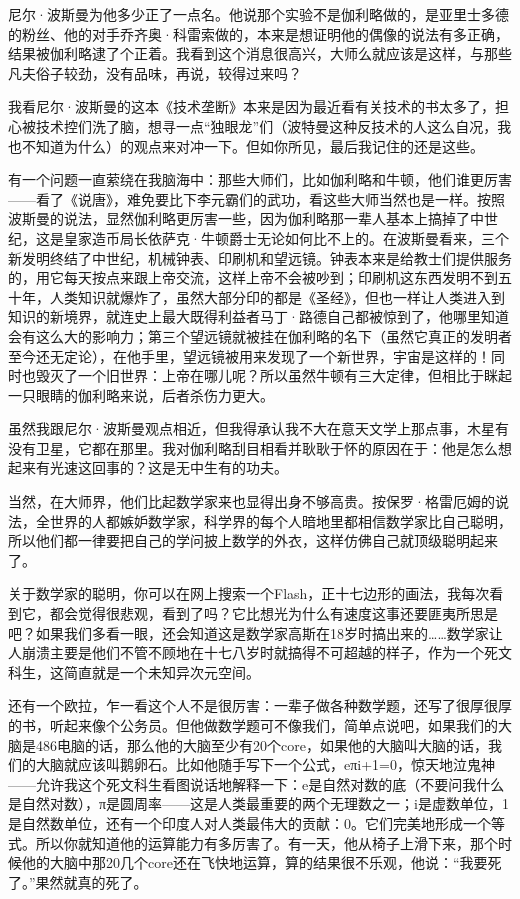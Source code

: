 尼尔·波斯曼为他多少正了一点名。他说那个实验不是伽利略做的，是亚里士多德的粉丝、他的对手乔齐奥·科雷索做的，本来是想证明他的偶像的说法有多正确，结果被伽利略逮了个正着。我看到这个消息很高兴，大师么就应该是这样，与那些凡夫俗子较劲，没有品味，再说，较得过来吗？

我看尼尔·波斯曼的这本《技术垄断》本来是因为最近看有关技术的书太多了，担心被技术控们洗了脑，想寻一点``独眼龙''们（波特曼这种反技术的人这么自况，我也不知道为什么）的观点来对冲一下。但如你所见，最后我记住的还是这些。

有一个问题一直萦绕在我脑海中：那些大师们，比如伽利略和牛顿，他们谁更厉害------看了《说唐》，难免要比下李元霸们的武功，看这些大师当然也是一样。按照波斯曼的说法，显然伽利略更厉害一些，因为伽利略那一辈人基本上搞掉了中世纪，这是皇家造币局长依萨克·牛顿爵士无论如何比不上的。在波斯曼看来，三个新发明终结了中世纪，机械钟表、印刷机和望远镜。钟表本来是给教士们提供服务的，用它每天按点来跟上帝交流，这样上帝不会被吵到；印刷机这东西发明不到五十年，人类知识就爆炸了，虽然大部分印的都是《圣经》，但也一样让人类进入到知识的新境界，就连史上最大既得利益者马丁·路德自己都被惊到了，他哪里知道会有这么大的影响力；第三个望远镜就被挂在伽利略的名下（虽然它真正的发明者至今还无定论），在他手里，望远镜被用来发现了一个新世界，宇宙是这样的！同时也毁灭了一个旧世界：上帝在哪儿呢？所以虽然牛顿有三大定律，但相比于眯起一只眼睛的伽利略来说，后者杀伤力更大。

虽然我跟尼尔·波斯曼观点相近，但我得承认我不大在意天文学上那点事，木星有没有卫星，它都在那里。我对伽利略刮目相看并耿耿于怀的原因在于：他是怎么想起来有光速这回事的？这是无中生有的功夫。

当然，在大师界，他们比起数学家来也显得出身不够高贵。按保罗·格雷厄姆的说法，全世界的人都嫉妒数学家，科学界的每个人暗地里都相信数学家比自己聪明，所以他们都一律要把自己的学问披上数学的外衣，这样仿佛自己就顶级聪明起来了。

关于数学家的聪明，你可以在网上搜索一个Flash，正十七边形的画法，我每次看到它，都会觉得很悲观，看到了吗？它比想光为什么有速度这事还要匪夷所思是吧？如果我们多看一眼，还会知道这是数学家高斯在18岁时搞出来的\ldots{}\ldots{}数学家让人崩溃主要是他们不管不顾地在十七八岁时就搞得不可超越的样子，作为一个死文科生，这简直就是一个未知异次元空间。

还有一个欧拉，乍一看这个人不是很厉害：一辈子做各种数学题，还写了很厚很厚的书，听起来像个公务员。但他做数学题可不像我们，简单点说吧，如果我们的大脑是486电脑的话，那么他的大脑至少有20个core，如果他的大脑叫大脑的话，我们的大脑就应该叫鹅卵石。比如他随手写下一个公式，eπi+1=0，惊天地泣鬼神------允许我这个死文科生看图说话地解释一下：e是自然对数的底（不要问我什么是自然对数），π是圆周率------这是人类最重要的两个无理数之一；i是虚数单位，1是自然数单位，还有一个印度人对人类最伟大的贡献：0。它们完美地形成一个等式。所以你就知道他的运算能力有多厉害了。有一天，他从椅子上滑下来，那个时候他的大脑中那20几个core还在飞快地运算，算的结果很不乐观，他说：``我要死了。''果然就真的死了。

